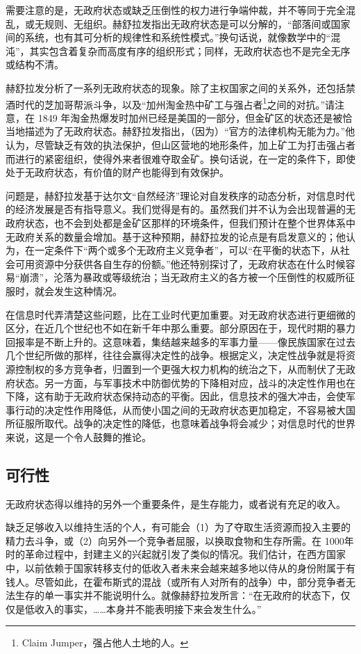 需要注意的是，无政府状态或缺乏压倒性的权力进行争端仲裁，并不等同于完全混乱，或无规则、无组织。赫舒拉发指出无政府状态是可以分解的，“部落间或国家间的系统，也有其可分析的规律性和系统性模式。”换句话说，就像数学中的“混沌”，其实包含着复杂而高度有序的组织形式；同样，无政府状态也不是完全无序或结构不清。

赫舒拉发分析了一系列无政府状态的现象。除了主权国家之间的关系外，还包括禁酒时代的芝加哥帮派斗争，以及“加州淘金热中矿工与强占者\footnote{Claim Jumper，强占他人土地的人。}之间的对抗。”请注意，在 1849 年淘金热爆发时加州已经是美国的一部分，但金矿区的状态还是被恰当地描述为了无政府状态。赫舒拉发指出，（因为）“官方的法律机构无能为力。”他认为，尽管缺乏有效的执法保护，但山区营地的地形条件，加上矿工为打击强占者而进行的紧密组织，使得外来者很难夺取金矿。换句话说，在一定的条件下，即使处于无政府状态，有价值的财产也能得到有效保护。

问题是，赫舒拉发基于达尔文“自然经济”理论对自发秩序的动态分析，对信息时代的经济发展是否有指导意义。我们觉得是有的。虽然我们并不认为会出现普遍的无政府状态，也不会到处都是金矿区那样的环境条件，但我们预计在整个世界体系中无政府关系的数量会增加。基于这种预期，赫舒拉发的论点是有启发意义的；他认为，在一定条件下“两个或多个无政府主义竞争者”，可以“在平衡的状态下，从社会可用资源中分获供各自生存的份额。”他还特别探讨了，无政府状态在什么时候容易“崩溃”，沦落为暴政或等级统治；当无政府主义的各方被一个压倒性的权威所征服时，就会发生这种情况。

在信息时代弄清楚这些问题，比在工业时代更加重要。对无政府状态进行更细微的区分，在近几个世纪也不如在新千年中那么重要。部分原因在于，现代时期的暴力回报率是不断上升的。这意味着，集结越来越多的军事力量——像民族国家在过去几个世纪所做的那样，往往会赢得决定性的战争。根据定义，决定性战争就是将资源控制权的多方竞争者，归置到一个更强大权力机构的统治之下，从而制伏了无政府状态。另一方面，与军事技术中防御优势的下降相对应，战斗的决定性作用也在下降，这有助于无政府状态保持动态的平衡。因此，信息技术的强大冲击，会使军事行动的决定性作用降低，从而使小国之间的无政府状态更加稳定，不容易被大国所征服所取代。战争的决定性的降低，也意味着战争将会减少；对信息时代的世界来说，这是一个令人鼓舞的推论。

\subsection{可行性}
无政府状态得以维持的另外一个重要条件，是生存能力，或者说有充足的收入。

缺乏足够收入以维持生活的个人，有可能会（1）为了夺取生活资源而投入主要的精力去斗争，或（2）向另外一个竞争者屈服，以换取食物和生存所需。在 1000年时的革命过程中，封建主义的兴起就引发了类似的情况。我们估计，在西方国家中，以前依赖于国家转移支付的低收入者未来会越来越多地以侍从的身份附属于有钱人。尽管如此，在霍布斯式的混战（或所有人对所有的战争）中，部分竞争者无法生存的单一事实并不能说明什么。就像赫舒拉发所言：“在无政府的状态下，仅仅是低收入的事实，……本身并不能表明接下来会发生什么。”
